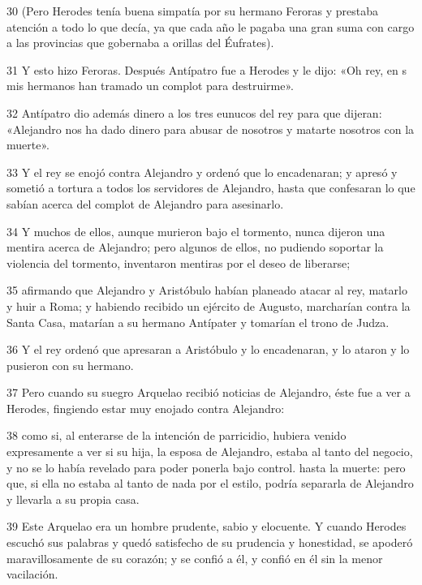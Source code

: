 \par 30 (Pero Herodes tenía buena simpatía por su hermano Feroras y prestaba atención a todo lo que decía, ya que cada año le pagaba una gran suma con cargo a las provincias que gobernaba a orillas del Éufrates).

\par 31 Y esto hizo Feroras. Después Antípatro fue a Herodes y le dijo: «Oh rey, en s mis hermanos han tramado un complot para destruirme».

\par 32 Antípatro dio además dinero a los tres eunucos del rey para que dijeran: «Alejandro nos ha dado dinero para abusar de nosotros y matarte nosotros con la muerte».

\par 33 Y el rey se enojó contra Alejandro y ordenó que lo encadenaran; y apresó y sometió a tortura a todos los servidores de Alejandro, hasta que confesaran lo que sabían acerca del complot de Alejandro para asesinarlo.

\par 34 Y muchos de ellos, aunque murieron bajo el tormento, nunca dijeron una mentira acerca de Alejandro; pero algunos de ellos, no pudiendo soportar la violencia del tormento, inventaron mentiras por el deseo de liberarse;

\par 35 afirmando que Alejandro y Aristóbulo habían planeado atacar al rey, matarlo y huir a Roma; y habiendo recibido un ejército de Augusto, marcharían contra la Santa Casa, matarían a su hermano Antípater y tomarían el trono de Judza.

\par 36 Y el rey ordenó que apresaran a Aristóbulo y lo encadenaran, y lo ataron y lo pusieron con su hermano.

\par 37 Pero cuando su suegro Arquelao recibió noticias de Alejandro, éste fue a ver a Herodes, fingiendo estar muy enojado contra Alejandro:


\par 38 como si, al enterarse de la intención de parricidio, hubiera venido expresamente a ver si su hija, la esposa de Alejandro, estaba al tanto del negocio, y no se lo había revelado para poder ponerla bajo control. hasta la muerte: pero que, si ella no estaba al tanto de nada por el estilo, podría separarla de Alejandro y llevarla a su propia casa.

\par 39 Este Arquelao era un hombre prudente, sabio y elocuente. Y cuando Herodes escuchó sus palabras y quedó satisfecho de su prudencia y honestidad, se apoderó maravillosamente de su corazón; y se confió a él, y confió en él sin la menor vacilación.

